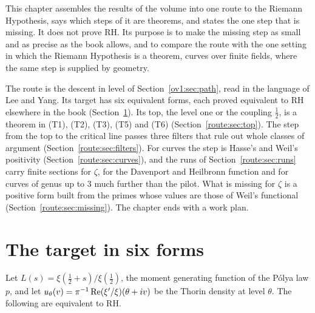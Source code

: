 
This chapter assembles the results of the volume into one route to the Riemann Hypothesis, says which steps of it are theorems, and states the one step that is missing. It does not prove RH. Its purpose is to make the missing step as small and as precise as the book allows, and to compare the route with the one setting in which the Riemann Hypothesis is a theorem, curves over finite fields, where the same step is supplied by geometry.

The route is the descent in level of Section~\ref{ov1:sec:path}, read in the language of Lee and Yang. Its target has six equivalent forms, each proved equivalent to RH elsewhere in the book (Section~\ref{route:sec:target}). Its top, the level one or the coupling $\frac12$, is a theorem in (T1), (T2), (T3), (T5) and (T6) (Section~\ref{route:sec:top}). The step from the top to the critical line passes three filters that rule out whole classes of argument (Section~\ref{route:sec:filters}). For curves the step is Hasse's and Weil's positivity (Section~\ref{route:sec:curves}), and the runs of Section~\ref{route:sec:runs} carry finite sections for $\zeta$, for the Davenport and Heilbronn function and for curves of genus up to $3$ much further than the pilot. What is missing for $\zeta$ is a positive form built from the primes whose values are those of Weil's functional (Section~\ref{route:sec:missing}). The chapter ends with a work plan.

\section{The target in six forms}\label{route:sec:target}

Let $L(s)=\xi(\frac12+s)/\xi(\frac12)$, the moment generating function of the P\'olya law $p$, and let $u_\theta(v)=\pi^{-1}\operatorname{Re}(\xi'/\xi)(\theta+iv)$ be the Thorin density at level $\theta$. The following are equivalent to RH.

